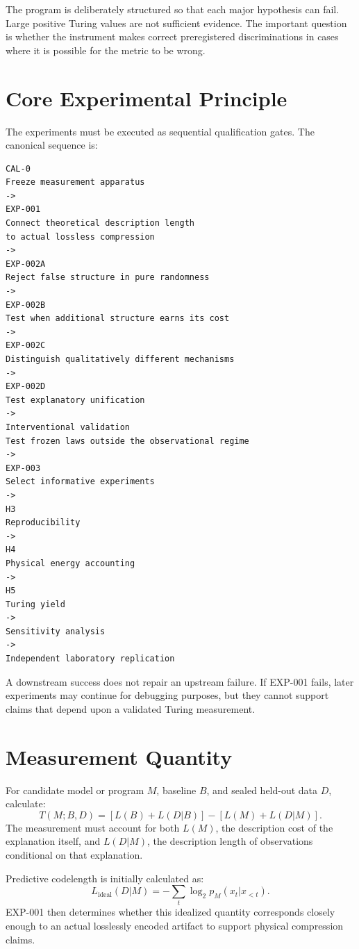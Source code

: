 \documentclass[11pt]{article}
\begin{document}
The program is deliberately structured so that each major hypothesis can fail. Large positive Turing values are not sufficient evidence. The important question is whether the instrument makes correct preregistered discriminations in cases where it is possible for the metric to be wrong.

\section{Core Experimental Principle}

The experiments must be executed as sequential qualification gates. The canonical sequence is:

\begin{verbatim}
CAL-0
Freeze measurement apparatus
->
EXP-001
Connect theoretical description length
to actual lossless compression
->
EXP-002A
Reject false structure in pure randomness
->
EXP-002B
Test when additional structure earns its cost
->
EXP-002C
Distinguish qualitatively different mechanisms
->
EXP-002D
Test explanatory unification
->
Interventional validation
Test frozen laws outside the observational regime
->
EXP-003
Select informative experiments
->
H3
Reproducibility
->
H4
Physical energy accounting
->
H5
Turing yield
->
Sensitivity analysis
->
Independent laboratory replication
\end{verbatim}

A downstream success does not repair an upstream failure. If EXP-001 fails, later experiments may continue for debugging purposes, but they cannot support claims that depend upon a validated Turing measurement.

\section{Measurement Quantity}

For candidate model or program \(M\), baseline \(B\), and sealed held-out data \(D\), calculate:
\[
T(M;B,D)
=
[L(B)+L(D|B)]
-
[L(M)+L(D|M)].
\]
The measurement must account for both \(L(M)\), the description cost of the explanation itself, and \(L(D|M)\), the description length of observations conditional on that explanation.

Predictive codelength is initially calculated as:
\[
L_{\text{ideal}}(D|M)
=
-\sum_t
\log_2
p_M(x_t|x_{<t}).
\]
EXP-001 then determines whether this idealized quantity corresponds closely enough to an actual losslessly encoded artifact to support physical compression claims.
\end{document}
